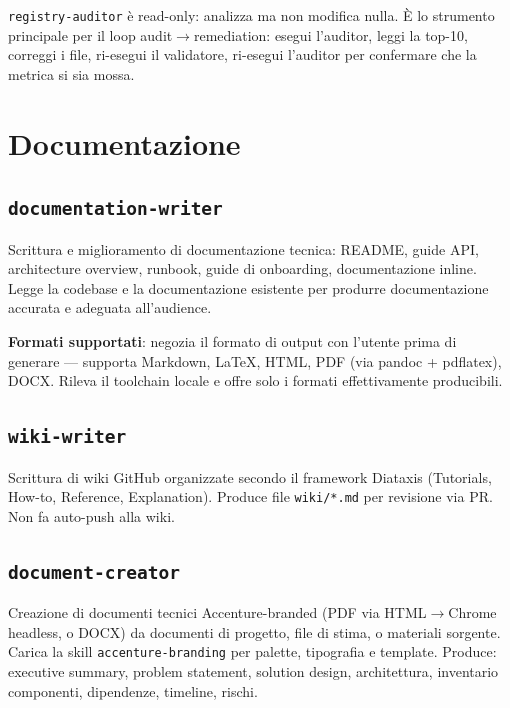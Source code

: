 \documentclass[12pt,a4paper,twoside]{book}
\begin{document}
\begin{notabox}
\texttt{registry-auditor} è read-only: analizza ma non modifica nulla. È lo strumento principale per il loop audit$\rightarrow$remediation: esegui l'auditor, leggi la top-10, correggi i file, ri-esegui il validatore, ri-esegui l'auditor per confermare che la metrica si sia mossa.
\end{notabox}

\chapter{Documentazione}

\section{\texttt{documentation-writer}}

Scrittura e miglioramento di documentazione tecnica: README, guide API, architecture overview, runbook, guide di onboarding, documentazione inline. Legge la codebase e la documentazione esistente per produrre documentazione accurata e adeguata all'audience.

\textbf{Formati supportati}: negozia il formato di output con l'utente prima di generare — supporta Markdown, \LaTeX, HTML, PDF (via pandoc + pdflatex), DOCX. Rileva il toolchain locale e offre solo i formati effettivamente producibili.

\section{\texttt{wiki-writer}}

Scrittura di wiki GitHub organizzate secondo il framework Diataxis (Tutorials, How-to, Reference, Explanation). Produce file \texttt{wiki/*.md} per revisione via PR. Non fa auto-push alla wiki.

\section{\texttt{document-creator}}

Creazione di documenti tecnici Accenture-branded (PDF via HTML$\rightarrow$Chrome headless, o DOCX) da documenti di progetto, file di stima, o materiali sorgente. Carica la skill \texttt{accenture-branding} per palette, tipografia e template. Produce: executive summary, problem statement, solution design, architettura, inventario componenti, dipendenze, timeline, rischi.
\end{document}
